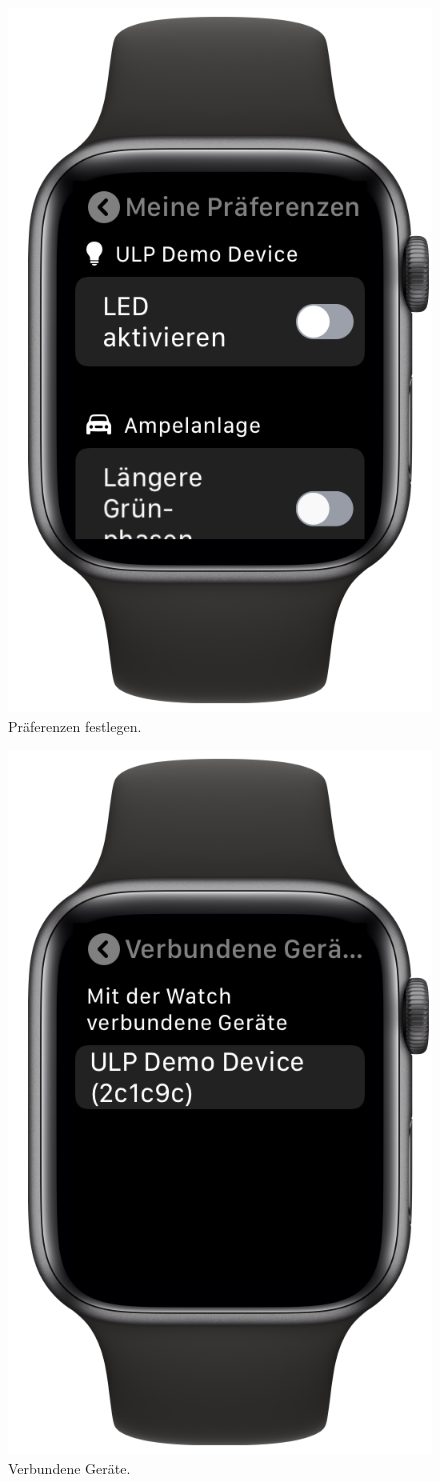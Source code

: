 \begin{minipage}{.45\textwidth}
	\begin{figure}[H]
		\centering
		\includegraphics[width=.68\textwidth]{./images/prototype/watchos/prefs.png}
		\caption{\label{fig:app:watchos:prefs}Präferenzen festlegen.}
	\end{figure}
\end{minipage}\hfill
\begin{minipage}{.45\textwidth}
	\begin{figure}[H]
		\centering
		\includegraphics[width=.68\textwidth]{./images/prototype/watchos/connectedTo.png}
		\caption{\label{fig:app:watchos:connectedTo}Verbundene Geräte.}
	\end{figure}
\end{minipage}
